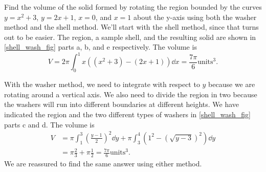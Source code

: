 \begin{example}\label{ex_shell_wash}%
Find the volume of the solid formed by rotating the region bounded by the curves $y=x^2+3$, $y=2x+1$, $x=0$, and $x=1$ about the y-axis using both the washer method and the shell method.
\solution
We'll start with the shell method, since that turns out to be easier.  The region, a sample shell, and the resulting solid are shown in \autoref{shell_wash_fig} parts a, b, and e respectively.  The volume is
\[
V=2\pi\int_0^1 x((x^2+3)-(2x+1))\dd x
=\frac{7\pi}6\text{units}^3.
\]

With the washer method, we need to integrate with respect to $y$ because we are rotating around a vertical axis.  We also need to divide the region in two because the washers will run into different boundaries at different heights.  We have indicated the region and the two different types of washers in \autoref{shell_wash_fig} parts c and d.  The volume is
\begin{align*}
V&=\pi\int_1^3\left(\frac{y-1}2\right)^2\dd y
+\pi\int_3^4\left(1^2-\left(\sqrt{y-3}\right)^2\right)\dd y\\
&=\pi\frac23+\pi\frac12
=\frac{7\pi}6\text{units}^3.
\end{align*}
We are reassured to find the same answer using either method.
\end{example}

